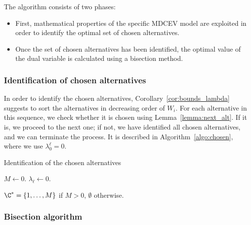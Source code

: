 \documentclass[12pt,a4paper]{article}
\begin{document}
The  algorithm consists of two phases:
\begin{itemize}
    \item First, mathematical properties of the specific MDCEV model
are exploited in order to identify the optimal set of chosen alternatives.
    \item Once the set of chosen alternatives has been identified, the optimal value of the dual variable is calculated using a bisection method.
\end{itemize}

\subsubsection*{Identification of chosen alternatives}





In order to identify the chosen alternatives, Corollary~\ref{cor:bounds_lambda} suggests to sort the alternatives in decreasing
order of $W_i$. For each alternative in this sequence, we check whether it is chosen using Lemma~\ref{lemma:next_alt}. If it is, we proceed to the next
one; if not, we have identified all chosen alternatives, and we can terminate the process.
It is described in Algorithm~\ref{algo:chosen}, where we use $\lambda^\ell_0 = 0$.

\begin{algorithm}[htb]
\caption{\label{algo:chosen}Identification of the chosen alternatives}
\DontPrintSemicolon
{}
\BlankLine

$M \leftarrow 0$.\;
$\lambda_\ell \leftarrow 0$.\;

    $\C^*= \{1,\ldots, M \}$ if $M>0$, $\emptyset$ otherwise.
\end{algorithm}


\subsubsection*{Bisection algorithm}
\end{document}
